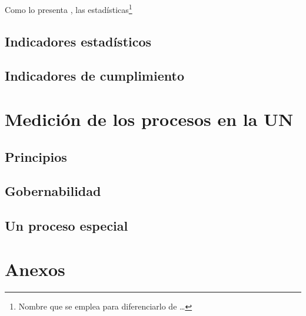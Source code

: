 \documentclass[
]{book}
\begin{document}
Como lo presenta \citet{Alberto2019}, las estadísticas\footnote{Nombre que se emplea para diferenciarlo de \ldots{}}

\hypertarget{indicadores-estaduxedsticos}{%
\section{Indicadores estadísticos}\label{indicadores-estaduxedsticos}}

\hypertarget{indicadores-de-cumplimiento}{%
\section{Indicadores de cumplimiento}\label{indicadores-de-cumplimiento}}

\hypertarget{indicadoresUN}{%
\chapter{Medición de los procesos en la UN}\label{indicadoresUN}}

\hypertarget{principios}{%
\section{Principios}\label{principios}}

\hypertarget{gobernabilidad}{%
\section{Gobernabilidad}\label{gobernabilidad}}

\hypertarget{un-proceso-especial}{%
\section{Un proceso especial}\label{un-proceso-especial}}

\hypertarget{anexos}{%
\chapter*{Anexos}\label{anexos}}

  
\end{document}
